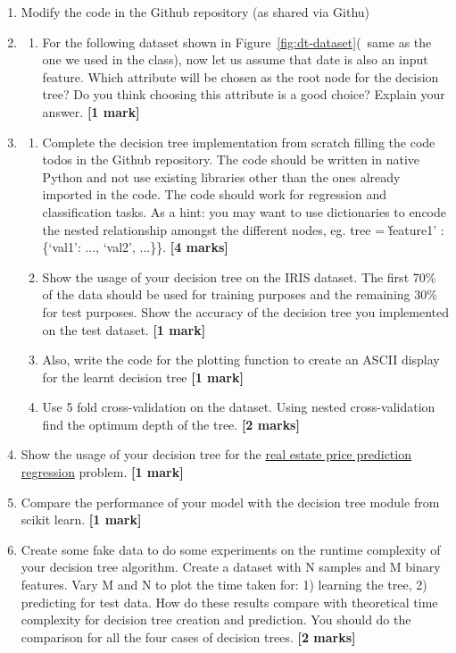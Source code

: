 \documentclass[colorlinks]{article}
\begin{document}
\begin{enumerate}
	\item Modify the code in the Github repository (as shared via Githu)
	\item 	\begin{enumerate}
		\item For the following dataset shown in Figure~\ref{fig:dt-dataset}(~same as the one we used in the class), now let us assume that date is also an input feature. Which attribute will be chosen as the root node for the decision tree? Do you think choosing this attribute is a good choice? Explain your answer.  \textbf{[1 mark]}
	\end{enumerate}



\item 	\begin{enumerate}
	

	
		\item Complete the decision tree implementation from scratch filling the code todos in the Github repository. The code should be written in native Python and not use existing libraries other than the ones already imported in the code. The code should work for regression and classification tasks. As a hint: you may want to use dictionaries to encode the nested relationship amongst the different nodes, eg. tree = \`feature1' :\{`val1': ..., `val2', ...\}\}. \textbf{[4 marks]}
		\item Show the usage of your decision tree on the IRIS dataset. The first 70\% of the data should be used for training purposes and the remaining 30\% for test purposes. Show the accuracy of the decision tree you implemented on the test dataset. \textbf{[1 mark]}
		\item Also, write the code for the plotting function to create an ASCII display for the learnt decision tree \textbf{[1 mark]}
		\item Use 5 fold cross-validation on the dataset. Using nested cross-validation find the optimum depth of the tree. \textbf{[2 marks]}
	\end{enumerate} 
	
	\item Show the usage of your decision tree for the \href{https://archive.ics.uci.edu/ml/datasets/Real+estate+valuation+data+set}{real estate price prediction regression} problem. \textbf{[1 mark]}
	\item Compare the performance of your model with the decision tree module from scikit learn. \textbf{[1 mark]}
	\item Create some fake data to do some experiments on the runtime complexity of your decision tree algorithm. Create a dataset with N samples and M binary features. Vary M and N to plot the time taken for: 1) learning the tree, 2) predicting for test data. How do these results compare with theoretical time complexity for decision tree creation and prediction. You should do the comparison for all the four cases of decision trees. \textbf{[2 marks]}	
	

\end{enumerate}
\end{document}

